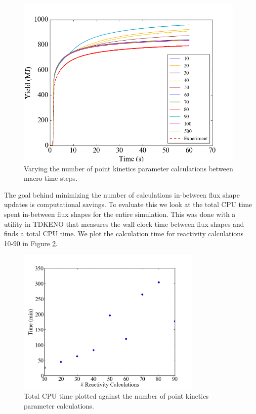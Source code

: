 \documentclass{anstrans}
\begin{document}
\begin{figure}[h]
    \centering
    \includegraphics[width = 9 cm]{figures/ptkinvar.png}
    \caption{Varying the number of point kinetics parameter calculations between macro time steps.}
    \label{fig:ptkinvar}
\end{figure}

The goal behind minimizing the number of calculations in-between flux shape updates is computational savings.  To evaluate this we look at the total CPU time spent in-between flux shapes for the entire simulation.  This was done with a utility in TDKENO that measures the wall clock time between flux shapes and finds a total CPU time. We plot the calculation time for reactivity calculations 10-90 in Figure \ref{fig:ptkin_time}.  

\begin{figure}[h]
    \centering
    \includegraphics[width=9cm]{figures/ptkin_time_var.png}
    \caption{Total CPU time plotted against the number of point kinetics parameter calculations. }
    \label{fig:ptkin_time}
\end{figure}
\end{document}
